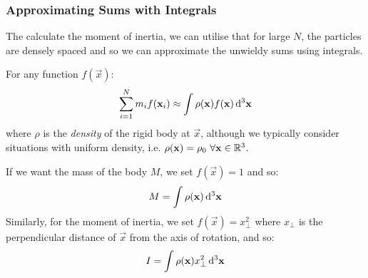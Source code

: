 \documentclass[../main.tex]{subfiles}
\begin{document}
\subsubsection{Approximating Sums with Integrals}
The calculate the moment of inertia, we can utilise that for large $N$, the particles are densely spaced and so we can approximate the unwieldy sums using integrals.

For any function $f(\vec{x})$:
\[
  \sum_{i = 1}^{N} m_i f(\vec{x}_i) \approx \int \rho(\vec{x}) f(\vec{x}) \d^3{\vec{x}}
\]
where $\rho$ is the \textit{density} of the rigid body at $\vec{x}$, although we typically consider situations with uniform density, i.e. $\rho(\mathbf{\bm{x}}) = \rho_0\ \forall \mathbf{\bm{x}} \in \mathbb{R}^3$.

If we want the mass of the body $M$, we set $f(\vec{x}) = 1$ and so:
\[
  M = \int \rho(\vec{x}) \d^3{\vec{x}}
\]
Similarly, for the moment of inertia, we set $f(\vec{x}) = x^2_{\perp}$ where $x_{\perp}$ is the perpendicular distance of $\vec{x}$ from the axis of rotation, and so:
\[
  I = \int \rho(\vec{x}) x^2_\perp \d^3{\vec{x}}
\]
\end{document}
